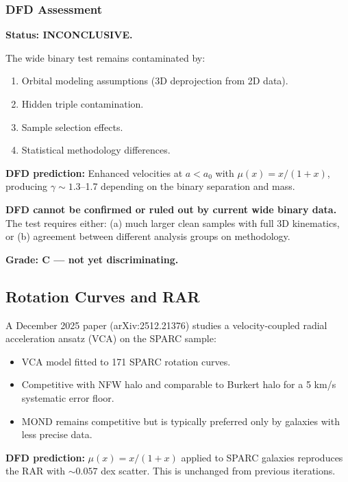 \documentclass[11pt]{article}
\newcommand{\aM}{a_0}
\begin{document}
\subsubsection{DFD Assessment}

\begin{tcolorbox}[colback=orange!5!white, colframe=orange!70!black,
  title=\textbf{Wide Binaries: Status at i25}]

\textbf{Status: INCONCLUSIVE.}

The wide binary test remains contaminated by:
\begin{enumerate}
  \item Orbital modeling assumptions (3D deprojection from 2D data).
  \item Hidden triple contamination.
  \item Sample selection effects.
  \item Statistical methodology differences.
\end{enumerate}

\textbf{DFD prediction:} Enhanced velocities at $a < \aM$ with
$\mu(x) = x/(1+x)$, producing $\gamma \sim 1.3$--1.7 depending on
the binary separation and mass.

\textbf{DFD cannot be confirmed or ruled out by current wide binary
data.} The test requires either: (a) much larger clean samples with
full 3D kinematics, or (b) agreement between different analysis groups
on methodology.

\textbf{Grade: C --- not yet discriminating.}

\end{tcolorbox}

\subsection{Rotation Curves and RAR}

A December 2025 paper (arXiv:2512.21376) studies a velocity-coupled
radial acceleration ansatz (VCA) on the SPARC sample:
\begin{itemize}
  \item VCA model fitted to 171 SPARC rotation curves.
  \item Competitive with NFW halo and comparable to Burkert halo
    for a 5 km/s systematic error floor.
  \item MOND remains competitive but is typically preferred only
    by galaxies with less precise data.
\end{itemize}

\textbf{DFD prediction:} $\mu(x) = x/(1+x)$ applied to SPARC
galaxies reproduces the RAR with $\sim 0.057$ dex scatter. This is
unchanged from previous iterations.
\end{document}
